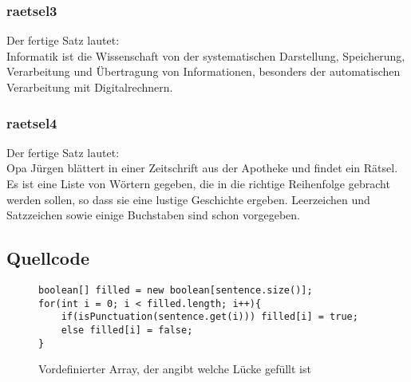\documentclass[a4paper, 12pt]{scrartcl}
\begin{document}
\subsubsection{raetsel3}
Der fertige Satz lautet:\\
Informatik ist die Wissenschaft von der systematischen Darstellung, Speicherung, Verarbeitung und Übertragung von Informationen, besonders der automatischen Verarbeitung mit Digitalrechnern.

\subsubsection{raetsel4}
Der fertige Satz lautet:\\
Opa Jürgen blättert in einer Zeitschrift aus der Apotheke und findet ein Rätsel. Es ist eine Liste von Wörtern gegeben, die in die richtige Reihenfolge gebracht werden sollen, so dass sie eine lustige Geschichte ergeben. Leerzeichen und Satzzeichen sowie einige Buchstaben sind schon vorgegeben.

\subsection{Quellcode}

\begin{figure}[H]
\centering
\begin{lstlisting}  
boolean[] filled = new boolean[sentence.size()];
for(int i = 0; i < filled.length; i++){
    if(isPunctuation(sentence.get(i))) filled[i] = true;
    else filled[i] = false;
}
\end{lstlisting}
\caption{Vordefinierter Array, der angibt welche Lücke gefüllt ist}
\end{figure}
\end{document}
